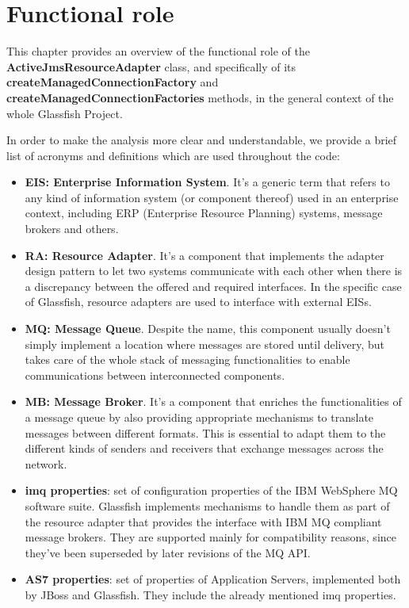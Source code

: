 \chapter{Functional role}
This chapter provides an overview of the functional role of the \textbf{ActiveJmsResourceAdapter} class, and specifically of its \textbf{createManagedConnectionFactory} and \textbf{createManagedConnectionFactories} methods, in the general context of the whole Glassfish Project.

In order to make the analysis more clear and understandable, we provide a brief list of acronyms and definitions which are used throughout the code:
\begin{itemize}
	\item \textbf{EIS: Enterprise Information System}. It's a generic term that refers to any kind of information system (or component thereof) used in an enterprise context, including ERP (Enterprise Resource Planning) systems, message brokers and others.
	\item \textbf{RA: Resource Adapter}. It's a component that implements the adapter design pattern to let two systems communicate with each other when there is a discrepancy between the offered and required interfaces. In the specific case of Glassfish, resource adapters are used to interface with external EISs.
	\item \textbf{MQ: Message Queue}. Despite the name, this component usually doesn't simply implement a location where messages are stored until delivery, but takes care of the whole stack of messaging functionalities to enable communications between interconnected components. 
	\item \textbf{MB: Message Broker}. It's a component that enriches the functionalities of a message queue by also providing appropriate mechanisms to translate messages between different formats. This is essential to adapt them to the different kinds of senders and receivers that exchange messages across the network. 
	\item \textbf{imq properties}: set of configuration properties of the IBM WebSphere MQ software suite. Glassfish implements mechanisms to handle them as part of the resource adapter that provides the interface with IBM MQ compliant message brokers. They are supported mainly for compatibility reasons, since they've been superseded by later revisions of the MQ API. 
	\item \textbf{AS7 properties}: set of properties of Application Servers, implemented both by JBoss and Glassfish. They include the already mentioned imq properties. 

\end{itemize}
